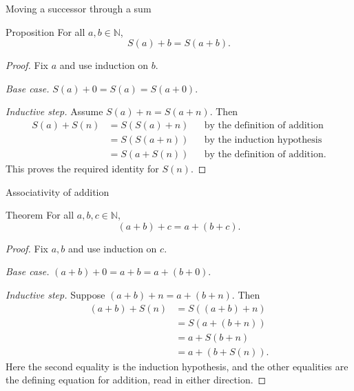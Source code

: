 \documentclass[aspectratio=169,11pt]{beamer}
\newcommand{\N}{\mathbb N}
\newcommand{\suc}[1]{S(#1)}
\begin{document}
\begin{frame}{Moving a successor through a sum}
  \begin{block}{Proposition}
    For all \(a,b\in\N\),
    \[
      \suc a+b=\suc{a+b}.
    \]
  \end{block}

  \begin{proof}
    Fix \(a\) and use induction on \(b\).

    \emph{Base case.}
    \(\suc a+0=\suc a=\suc{a+0}\).

    \emph{Inductive step.} Assume \(\suc a+n=\suc{a+n}\).  Then
    \begin{align*}
      \suc a+\suc n
        &=\suc{\suc a+n} &&\text{by the definition of addition}\\
        &=\suc{\suc{a+n}} &&\text{by the induction hypothesis}\\
        &=\suc{a+\suc n} &&\text{by the definition of addition}.
    \end{align*}
    This proves the required identity for \(\suc n\).
  \end{proof}
\end{frame}

\begin{frame}{Associativity of addition}
  \footnotesize
  \begin{block}{Theorem}
    For all \(a,b,c\in\N\),
    \[
      (a+b)+c=a+(b+c).
    \]
  \end{block}

  \begin{proof}
    Fix \(a,b\) and use induction on \(c\).

    \emph{Base case.}
    \((a+b)+0=a+b=a+(b+0)\).

    \emph{Inductive step.} Suppose \((a+b)+n=a+(b+n)\).  Then
    \begin{align*}
      (a+b)+\suc n
        &=\suc{(a+b)+n}\\
        &=\suc{a+(b+n)}\\
        &=a+\suc{b+n}\\
        &=a+(b+\suc n).
    \end{align*}
    Here the second equality is the induction hypothesis, and the other
    equalities are the defining equation for addition, read in either direction.
  \end{proof}
\end{frame}
\end{document}
